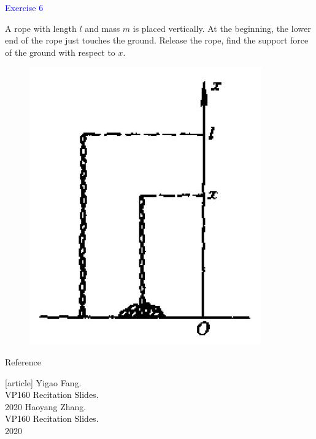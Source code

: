 \documentclass{beamer}
\begin{document}
\begin{frame}
\textcolor{blue}{Exercise 6}

A rope with length $l$ and mass $m$ is placed vertically. At the beginning, the lower end of the rope just touches the ground. Release the rope, find the support force of the ground with respect to $x$.
\begin{figure}[htbp]
\centering
\includegraphics[width=0.4 \linewidth, angle =0]{ex6.png}
\label{fig:6}
\end{figure}

\end{frame}


\begin{frame}{Reference}
  \begin{thebibliography}{9}
  [article]
   Yigao Fang.\\
  \textcolor{black}{VP160 Recitation Slides.}\\
  2020
   Haoyang Zhang.\\
  \textcolor{black}{VP160 Recitation Slides.}\\
  2020
  \end{thebibliography}
  \end{frame}
  
\end{document}

